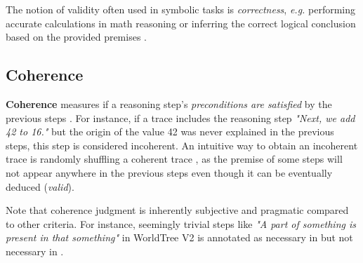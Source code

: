 The notion of validity often used in symbolic tasks is \textit{correctness}, \textit{e.g.} performing accurate calculations in math reasoning \citep{DBLP:conf/iclr/LightmanKBEBLLS24, jacovi-etal-2024-chain, zheng2024processbenchidentifyingprocesserrors} or inferring the correct logical conclusion based on the provided premises \citep{wu2024cofcastepwisecounterfactualmultihop, jacovi-etal-2024-chain, song2025prmbenchfinegrainedchallengingbenchmark}.



\subsection{Coherence}
\label{sec:coherence}

\textbf{Coherence} measures if a reasoning step's \textit{preconditions are satisfied} by the previous steps \citep{wang-etal-2023-towards}. For instance, if a trace includes the reasoning step \textit{"Next, we add 42 to 16."} but the origin of the value 42 was never explained in the previous steps, this step is considered incoherent. An intuitive way to obtain an incoherent trace is randomly shuffling a coherent trace \citep{wang-etal-2023-towards, nguyen-etal-2024-direct}, as the premise of some steps will not appear anywhere in the previous steps even though it can be eventually deduced (\textit{valid}).

Note that coherence judgment is inherently subjective and pragmatic compared to other criteria. For instance, seemingly trivial steps like \textit{"A part of something is present in that something"} in WorldTree V2 \citep{xie-etal-2020-worldtree} is annotated as necessary in \citet{dalvi-etal-2021-explaining} but not necessary in \citet{Ott_2023}.



